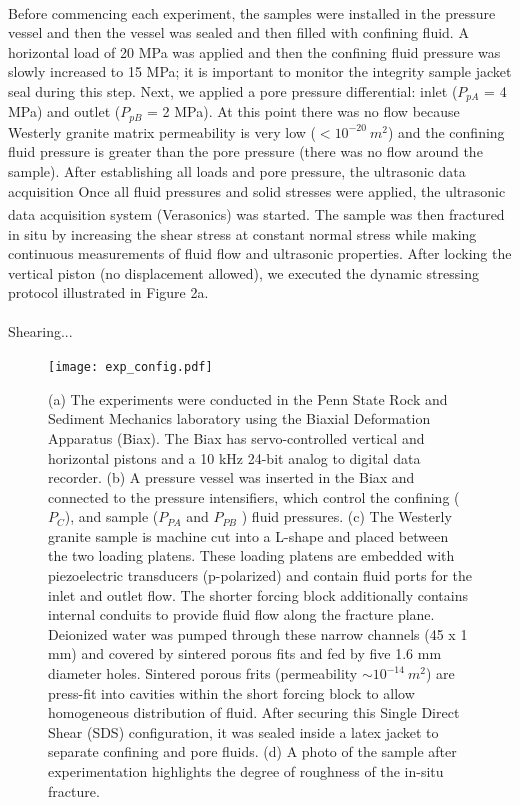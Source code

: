 \documentclass[letterpaper,10pt]{article}
\begin{document}
\paragraph{} Before commencing each experiment, the samples were installed in the pressure vessel and then the vessel was sealed and then filled with confining fluid. A horizontal load of 20 MPa was applied and then the confining fluid pressure was slowly increased to 15 MPa; it is important to monitor the integrity sample jacket seal during this step. Next, we applied a pore pressure differential: inlet ($P_{pA}$ = 4 MPa) and outlet ($P_{pB}$ = 2 MPa). At this point there was no flow because Westerly granite matrix permeability is very low ($< 10^{-20}\ m^2$) and the confining fluid pressure is greater than the pore pressure (there was no flow around the sample). After establishing all loads and pore pressure, the ultrasonic data acquisition Once all fluid pressures and solid stresses were applied, the ultrasonic data acquisition system (Verasonics\textsuperscript{\textregistered}) was started. The sample was then fractured in situ by increasing the shear stress at constant normal stress while making continuous measurements of fluid flow and ultrasonic properties. After locking the vertical piston (no displacement allowed), we executed the dynamic stressing protocol illustrated in Figure 2a.

\paragraph{} Shearing...

\newpage

\begin{figure}[ht] 
	\centering 
	\texttt{[image: exp\_config.pdf]}
	\caption[]{(a) The experiments were conducted in the Penn State Rock and Sediment Mechanics laboratory using the Biaxial Deformation Apparatus (Biax). The Biax has servo-controlled vertical and horizontal pistons and a 10 kHz 24-bit analog to digital data recorder. (b) A pressure vessel was inserted in the Biax and connected to the pressure intensifiers, which control the confining ($P_C$), and sample ($P_{PA}$ and $P_{PB}$ ) fluid pressures. (c) The Westerly granite sample is machine cut into a L-shape and placed between the two loading platens. These loading platens are embedded with piezoelectric transducers (p-polarized) and contain fluid ports for the inlet and outlet flow. The shorter forcing block additionally contains internal conduits to provide fluid flow along the fracture plane. Deionized water was pumped through these narrow channels (45 x 1 mm) and covered by sintered porous fits and fed by five 1.6 mm diameter holes. Sintered porous frits (permeability $\sim 10^{-14}\ m^2$) are press-fit into cavities within the short forcing block to allow homogeneous distribution of fluid. After securing this Single Direct Shear (SDS) configuration, it was sealed inside a latex jacket to separate confining and pore fluids. (d) A photo of the sample after experimentation highlights the degree of roughness of the in-situ fracture.}
	\label{fig:samplesetup} 
\end{figure}
\end{document}
